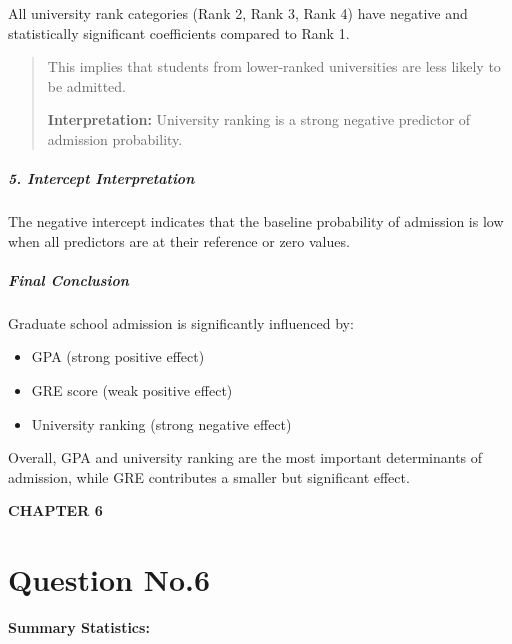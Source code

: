 All university rank categories (Rank 2, Rank 3, Rank 4) have negative
and statistically significant coefficients compared to Rank 1.

\begin{quote}
This implies that students from lower-ranked universities are less
likely to be admitted.

\textbf{Interpretation:} University ranking is a strong negative
predictor of admission probability.
\end{quote}

\subparagraph{5. Intercept
Interpretation}\label{intercept-interpretation}

The negative intercept indicates that the baseline probability of
admission is low when all predictors are at their reference or zero
values.

\subparagraph{Final Conclusion}\label{final-conclusion}

Graduate school admission is significantly influenced by:

\begin{itemize}
\item
  GPA (strong positive effect)
\item
  GRE score (weak positive effect)
\item
  University ranking (strong negative effect)
\end{itemize}

Overall, GPA and university ranking are the most important determinants
of admission, while GRE contributes a smaller but significant effect.

\textbf{CHAPTER 6}

\section{Question No.6}\label{question-no.6}

\textbf{Summary Statistics:}

